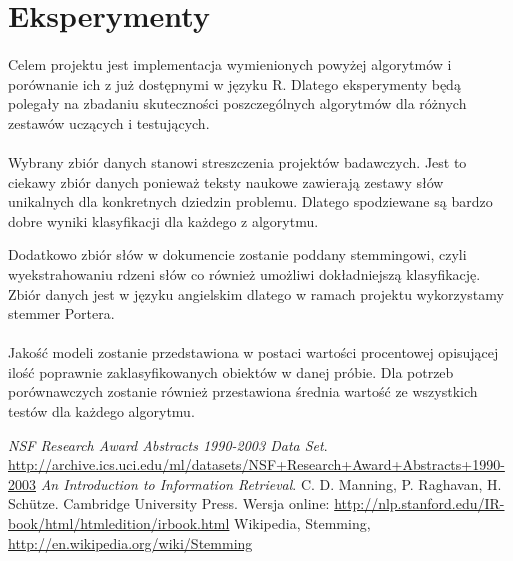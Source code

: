 \documentclass[a4paper,12pt]{article}
\begin{document}
\section{Eksperymenty}
\paragraph{}
Celem projektu jest implementacja wymienionych powyżej algorytmów i porównanie ich z już dostępnymi w języku R. Dlatego eksperymenty będą polegały na zbadaniu skuteczności poszczególnych algorytmów dla różnych zestawów uczących i testujących. 


\paragraph{}
Wybrany zbiór danych stanowi streszczenia projektów badawczych. Jest to
ciekawy zbiór danych ponieważ teksty naukowe zawierają zestawy słów
unikalnych dla konkretnych dziedzin problemu. Dlatego spodziewane są bardzo
dobre wyniki klasyfikacji dla każdego z algorytmu. 

Dodatkowo zbiór słów w dokumencie zostanie poddany stemmingowi, czyli
wyekstrahowaniu rdzeni słów co również umożliwi dokładniejszą klasyfikację.
Zbiór danych jest w języku angielskim dlatego w ramach projektu wykorzystamy
stemmer Portera.  


\paragraph{}
Jakość modeli zostanie przedstawiona w postaci wartości procentowej
opisującej ilość poprawnie zaklasyfikowanych obiektów w danej próbie. Dla
potrzeb porównawczych zostanie również przestawiona średnia wartość ze
wszystkich testów dla każdego algorytmu. 


\begin{thebibliography}{9}

   \emph{NSF Research Award Abstracts 1990-2003 Data Set}.
   \url{http://archive.ics.uci.edu/ml/datasets/NSF+Research+Award+Abstracts+1990-2003}
	\emph{An Introduction to Information Retrieval}. 
	C. D. Manning, P. Raghavan, H. Sch\"utze.
	Cambridge University Press.
	Wersja online: \url{http://nlp.stanford.edu/IR-book/html/htmledition/irbook.html}
	Wikipedia, Stemming, \url{http://en.wikipedia.org/wiki/Stemming}

\end{thebibliography}
\end{document}
